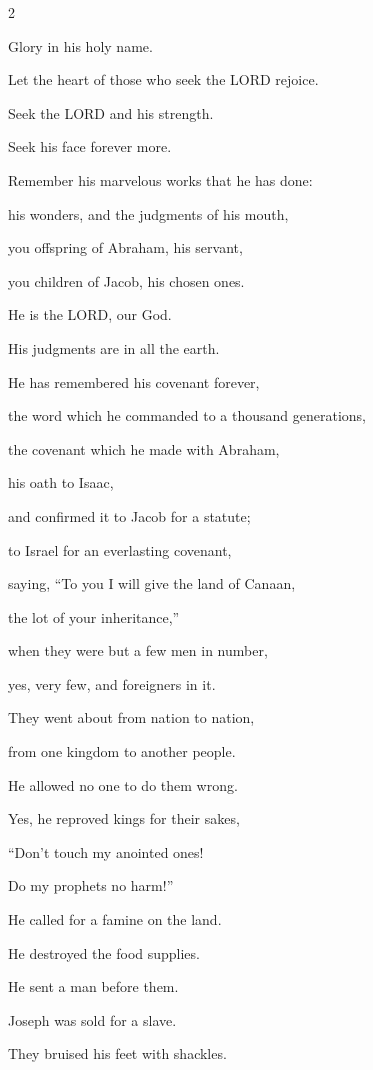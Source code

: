 \begin{multicols}{2}
	
	\myverse{}Glory in his holy name.
	
	Let the heart of those who seek the LORD rejoice.
	
	
	\myverse{}Seek the LORD and his strength.
	
	Seek his face forever more.
	
	
	\myverse{}Remember his marvelous works that he has done:
	
	his wonders, and the judgments of his mouth,
	
	
	\myverse{}you offspring of Abraham, his servant,
	
	you children of Jacob, his chosen ones.
	
	
	\myverse{}He is the LORD, our God.
	
	His judgments are in all the earth.
	
	
	\myverse{}He has remembered his covenant forever,
	
	the word which he commanded to a thousand generations,
	
	
	\myverse{}the covenant which he made with Abraham,
	
	his oath to Isaac,
	
	
	\myverse{}and confirmed it to Jacob for a statute;
	
	to Israel for an everlasting covenant,
	
	
	\myverse{}saying, “To you I will give the land of Canaan,
	
	the lot of your inheritance,”
	
	
	\myverse{}when they were but a few men in number,
	
	yes, very few, and foreigners in it.
	
	
	\myverse{}They went about from nation to nation,
	
	from one kingdom to another people.
	
	
	\myverse{}He allowed no one to do them wrong.
	
	Yes, he reproved kings for their sakes,
	
	
	\myverse{}“Don’t touch my anointed ones!
	
	Do my prophets no harm!”
	
	
	\myverse{}He called for a famine on the land.
	
	He destroyed the food supplies.
	
	
	\myverse{}He sent a man before them.
	
	Joseph was sold for a slave.
	
	
	\myverse{}They bruised his feet with shackles.
	

\end{multicols}
